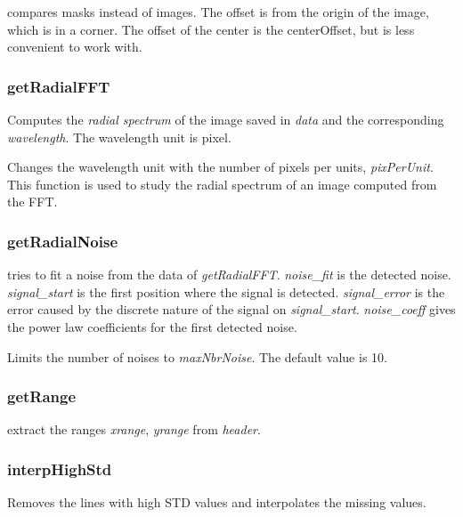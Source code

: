  compares masks instead of images.
\edf
The offset is from the origin of the image, which is in a corner. The offset of the center is the centerOffset, but is less convenient to work with.
\subsubsection{getRadialFFT}
\bdf
{} Computes the \emph{radial spectrum} of the image saved in \emph{data} and the corresponding \emph{wavelength}. The wavelength unit is pixel.

 Changes the wavelength unit with the number of pixels per units, \emph{pixPerUnit}.
\edf
This function is used to study the radial spectrum of an image computed from the FFT.
\subsubsection{getRadialNoise}
\bdf
{} tries to fit a noise from the data of \emph{getRadialFFT}. \emph{noise\_fit} is the detected noise. \emph{signal\_start} is the first position where the signal is detected. \emph{signal\_error} is the error caused by the discrete nature of the signal on \emph{signal\_start}. \emph{noise\_coeff} gives the power law coefficients for the first detected noise.

 Limits the number of noises to \emph{maxNbrNoise}. The default value is 10.
\edf
\subsubsection{getRange}
\bdf
{} extract the ranges \emph{xrange}, \emph{yrange} from \emph{header}.
\edf
\subsubsection{interpHighStd}
\bdf
{} Removes the lines with high STD values and interpolates the missing values.
\edf
